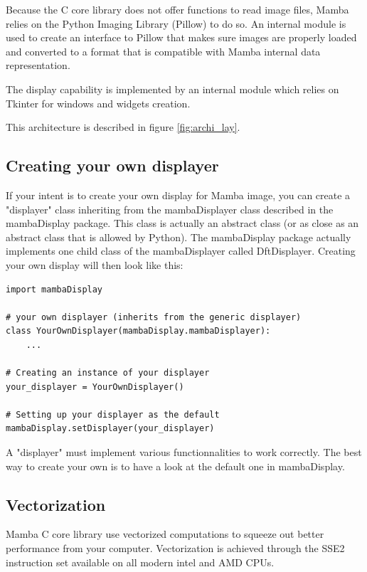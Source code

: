 \documentclass[a4paper,10pt,oneside]{article}
\begin{document}
Because the C core library does not offer functions to read image files, Mamba
relies on the Python Imaging Library (Pillow) to do so. An internal module is used
to create an interface to Pillow that makes sure images are properly loaded and
converted to a format that is compatible with Mamba internal data representation.

The display capability is implemented by an internal module which relies on
Tkinter for windows and widgets creation.

This architecture is described in figure \ref{fig:archi_lay}.

\subsection{Creating your own displayer}
\label{cha:create_own_disp}

If your intent is to create your own display for Mamba image, you can create
a "displayer" class inheriting from the mambaDisplayer class described in the
mambaDisplay package. This class is actually an abstract class (or as close
as an abstract class that is allowed by Python). The mambaDisplay package
actually implements one child class of the mambaDisplayer called DftDisplayer.
Creating your own display will then look like this:

\lstset{language=Python}
\begin{lstlisting}
import mambaDisplay

# your own displayer (inherits from the generic displayer)
class YourOwnDisplayer(mambaDisplay.mambaDisplayer):
    ...
    
# Creating an instance of your displayer
your_displayer = YourOwnDisplayer()

# Setting up your displayer as the default
mambaDisplay.setDisplayer(your_displayer)
\end{lstlisting}

A "displayer" must implement various functionnalities to work correctly. The 
best way to create your own is to have a look at the default one in mambaDisplay.

\subsection{Vectorization}
\label{cha:vectorization}

Mamba C core library use vectorized computations to squeeze out better 
performance from your computer. Vectorization is achieved through the SSE2
instruction set available on all modern intel and AMD CPUs.
\end{document}
